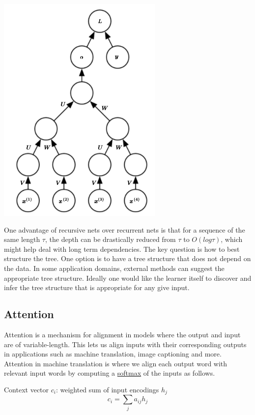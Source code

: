 \documentclass[12pt]{article}
\begin{document}
        \begin{center}
            \includegraphics[scale=0.65]{RNNTree}
        \end{center}

        One advantage of recursive nets over recurrent nets is that for a sequence of the same length $\tau$, the depth
        can be drastically reduced from $\tau$ to $O(log \tau)$, which might help deal with long term dependencies. The
        key question is how to best structure the tree. One option is to have a tree structure that does not depend on
        the data. In some application domains, external methods can suggest the appropriate tree structure. Ideally one
        would like the learner itself to discover and infer the tree structure that is appropriate for any give input.
    
    \subsection{Attention} \label{sec:Attention}
        Attention is a mechanism for alignment in models where the output and input are of variable-length. This lets us
        align inputs with their corresponding outputs in applications such as machine translation, image captioning and
        more. Attention in machine translation is where we align each output word with relevant input words by computing
        a \hyperref[sec:Softmax]{softmax} of the inputs as follows.
        
        Context vector $c_i$: weighted sum of input encodings $h_j$
        $$ c_i = \sum_j a_{ij}h_j $$
\end{document}
